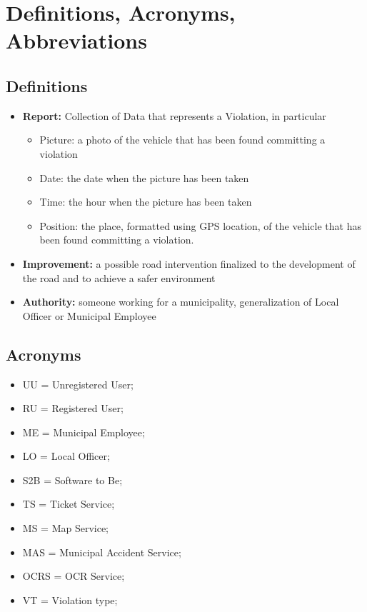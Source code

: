 		\section{Definitions, Acronyms, Abbreviations}
			\subsection{Definitions}
				\begin{itemize}
					\item \textbf{Report:} Collection of Data that represents a Violation, in particular
						\begin{itemize}
							\item Picture: a photo of the vehicle that has been found committing a violation
							\item Date: the date when the picture has been taken
							\item Time: the hour when the picture has been taken
							\item Position: the place, formatted using GPS location, of the vehicle that has been found committing a violation.
						\end{itemize}
					\item \textbf{Improvement:} a possible road intervention finalized to the development of the road and to achieve a safer environment
					\item \textbf{Authority:} someone working for a municipality, generalization of Local Officer or Municipal Employee
				\end{itemize}
			\subsection{Acronyms}
				\begin{itemize}
					\item UU = Unregistered User;
					\item RU = Registered User;
					\item ME = Municipal Employee;
					\item LO = Local Officer;
					\item S2B = Software to Be;
					\item TS = Ticket Service;
					\item MS = Map Service;
					\item MAS = Municipal Accident Service;
					\item OCRS = OCR Service;
					\item VT = Violation type;
				\end{itemize}
